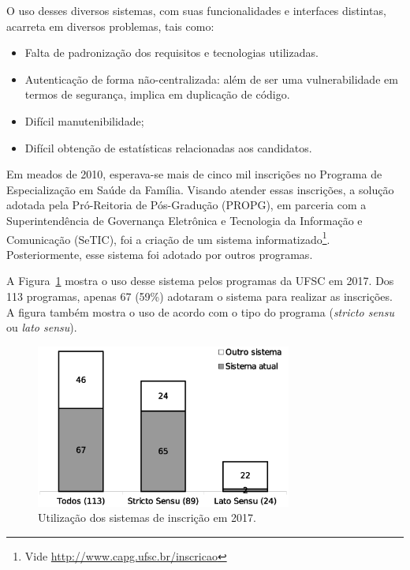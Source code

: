 \documentclass[
  10.5pt,				  %
	openright,			%
	twoside,			  %
  a5paper,
  chapter=TITLE,	%
	section=TITLE,	%
  hyphens,        %
	english,        %
	brazil          %
]{abntex2}
\begin{document}
O uso desses diversos sistemas, com suas funcionalidades e interfaces distintas, acarreta em diversos problemas, tais como:
\begin{itemize}
  \item Falta de padronização dos requisitos e tecnologias utilizadas.
  \item Autenticação de forma não-centralizada: além de ser uma vulnerabilidade em termos de segurança, implica em duplicação de código.
  \item Difícil manutenibilidade;
  \item Difícil obtenção de estatísticas relacionadas aos candidatos.
\end{itemize}

Em meados de 2010, esperava-se mais de cinco mil inscrições no Programa de Especialização em Saúde da Família. Visando atender essas inscrições, a solução adotada pela Pró-Reitoria de Pós-Gradução (PROPG), em parceria com a Superintendência de Governança Eletrônica e Tecnologia da Informação e Comunicação (SeTIC), foi a criação de um sistema informatizado\footnote{Vide \href{http://www.capg.ufsc.br/inscricao}{http://www.capg.ufsc.br/inscricao}}. Posteriormente, esse sistema foi adotado por outros programas.

A Figura~\ref{fig:uso_sistemas} mostra o uso desse sistema pelos programas da UFSC em 2017. Dos 113 programas, apenas 67 (59\%) adotaram o sistema para realizar as inscrições. A figura também mostra o uso de acordo com o tipo do programa (\emph{stricto sensu} ou \emph{lato sensu}).


\begin{figure}[!ht]
  \caption{\label{fig:uso_sistemas}Utilização dos sistemas de inscrição em 2017.}
  \begin{center}
    \includegraphics[width=0.75\textwidth]{uso_sistema_atual}
  \end{center}
\end{figure}
\end{document}
